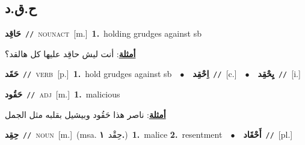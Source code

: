 \documentclass[10pt,a4paper,twoside]{article} %
\begin{document}
\begin{multicols}{2}
\vspace{-3mm}
\subsection*{\color{blue}\foreignlanguage{arabic}{ح.ق.د}\color{blue}{}} 

{\setlength\topsep{0pt}\textbf{\foreignlanguage{arabic}{حَاقِد}}\ {\color{gray}\texttt{//}\color{black}}\ \textsc{noun\textunderscore act}\ [m.]\ \textbf{1.}~holding grudges against sb\  \begin{flushright}\color{gray}\foreignlanguage{arabic}{\textbf{\underline{\foreignlanguage{arabic}{أمثلة}}}: أنت ليش حاقِد عليها كل هالقد؟}\end{flushright}\color{black}} \vspace{2mm}

{\setlength\topsep{0pt}\textbf{\foreignlanguage{arabic}{حَقَد}}\ {\color{gray}\texttt{//}\color{black}}\ \textsc{verb}\ [p.]\ \textbf{1.}~hold grudges against sb\ \ $\bullet$\ \ \setlength\topsep{0pt}\textbf{\foreignlanguage{arabic}{اِحْقِد}}\ {\color{gray}\texttt{//}\color{black}}\ [c.]\ \ $\bullet$\ \ \setlength\topsep{0pt}\textbf{\foreignlanguage{arabic}{يِحْقِد}}\ {\color{gray}\texttt{//}\color{black}}\ [i.]\ } \vspace{2mm}

{\setlength\topsep{0pt}\textbf{\foreignlanguage{arabic}{حَقُود}}\ {\color{gray}\texttt{//}\color{black}}\ \textsc{adj}\ [m.]\ \textbf{1.}~malicious\  \begin{flushright}\color{gray}\foreignlanguage{arabic}{\textbf{\underline{\foreignlanguage{arabic}{أمثلة}}}: ناصر هذا حَقُود وبيشيل بقلبه مثل الجمل}\end{flushright}\color{black}} \vspace{2mm}

{\setlength\topsep{0pt}\textbf{\foreignlanguage{arabic}{حِقِد}}\ {\color{gray}\texttt{//}\color{black}}\ \textsc{noun}\ [m.]\ \color{gray}(msa. \foreignlanguage{arabic}{حِقْد}~\foreignlanguage{arabic}{\textbf{١.}})\color{black}\ \textbf{1.}~malice  \textbf{2.}~resentment\ \ $\bullet$\ \ \setlength\topsep{0pt}\textbf{\foreignlanguage{arabic}{أَحْقَاد}}\ {\color{gray}\texttt{//}\color{black}}\ [pl.]\ } \vspace{2mm}


\end{multicols}
\end{document}
